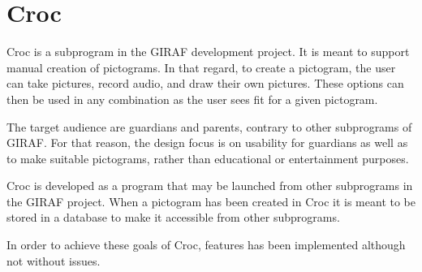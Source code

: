 \section{Croc}
Croc is a subprogram in the GIRAF development project. 
It is meant to support manual creation of pictograms.
In that regard, to create a pictogram, the user can take pictures, record audio, and draw their own pictures.
These options can then be used in any combination as the user sees fit for a given pictogram.

The target audience are guardians and parents, contrary to other subprograms of GIRAF. 
For that reason, the design focus is on usability for guardians as well as to make suitable pictograms, rather than educational or entertainment purposes.

Croc is developed as a program that may be launched from other subprograms in the GIRAF project.
When a pictogram has been created in Croc it is meant to be stored in a database to make it accessible from other subprograms.

In order to achieve these goals of Croc, features has been implemented although not without issues.
